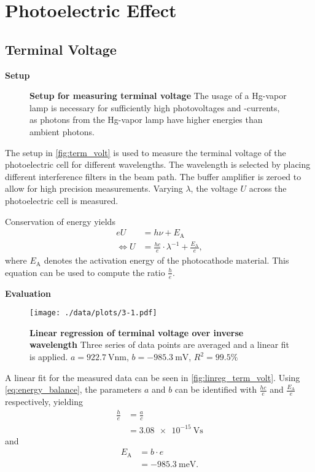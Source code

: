 \chapter{Photoelectric Effect}


\section{Terminal Voltage}%

\textbf{Setup}\\
\begin{figure}[tbp]
	\centering
	\caption[Setup for measuring terminal voltage]{\textbf{Setup for measuring terminal voltage} The usage of a Hg-vapor lamp is necessary for sufficiently high photovoltages and -currents, as photons from the Hg-vapor lamp have higher energies than ambient photons.}
	\label{fig:term_volt}
\end{figure}
The setup in \autoref{fig:term_volt} is used to measure the terminal voltage of the photoelectric cell for different wavelengths.
The wavelength is selected by placing different interference filters in the beam path.	%
The buffer amplifier is zeroed to allow for high precision measurements.
Varying $\lambda$, the voltage $U$ across the photoelectric cell is measured.

Conservation of energy yields
\begin{align}
	eU &= h\nu+E_\text{A} \nonumber \\
	\Leftrightarrow U &= \frac{hc}{e}\cdot\lambda^{-1}+\frac{E_\text{A}}{e}, \label{eq:energy_balance}
\end{align}
where $E_\text{A}$ denotes the activation energy of the photocathode material.
This equation can be used to compute the ratio $\frac{h}{e}$.

\textbf{Evaluation}\\
\begin{figure}[tbp]
	\centering
	\texttt{[image: ./data/plots/3-1.pdf]}
	\caption[Linear regression of terminal voltage over inverse wavelength]{\textbf{Linear regression of terminal voltage over inverse wavelength} Three series of data points are averaged and a linear fit is applied. $a=\SI{922.7}{\volt\nm}$, $b=\SI{-985.3}{\milli\V}$, $R^2=99.5\%$}
	\label{fig:linreg_term_volt}
\end{figure}

A linear fit for the measured data can be seen in \autoref{fig:linreg_term_volt}.
Using \autoref{eq:energy_balance}, the parameters $a$ and $b$ can be identified with $\frac{hc}{e}$ and $\frac{E_\text{A}}{e}$ respectively, yielding
\begin{align*}
	\frac{h}{e} &= \frac{a}{c} \\
	&=\SI{3.08e-15}{\volt\second}
\end{align*}
and
\begin{align*}
	E_\text{A} &= b\cdot e \\
	&=\SI{-985.3}{\milli\eV}.
\end{align*}

